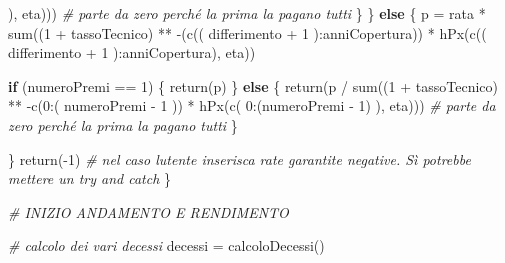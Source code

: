 \documentclass[
]{article}
\newenvironment{Shaded}{\begin{snugshade}}{\end{snugshade}}
\newcommand{\CommentTok}[1]{\textcolor[rgb]{0.56,0.35,0.01}{\textit{#1}}}
\newcommand{\ControlFlowTok}[1]{\textcolor[rgb]{0.13,0.29,0.53}{\textbf{#1}}}
\newcommand{\DecValTok}[1]{\textcolor[rgb]{0.00,0.00,0.81}{#1}}
\newcommand{\FunctionTok}[1]{\textcolor[rgb]{0.00,0.00,0.00}{#1}}
\newcommand{\NormalTok}[1]{#1}
\newcommand{\OtherTok}[1]{\textcolor[rgb]{0.56,0.35,0.01}{#1}}
\newcommand{\SpecialCharTok}[1]{\textcolor[rgb]{0.00,0.00,0.00}{#1}}
\begin{document}
\begin{Shaded}
\begin{Highlighting}[]
\NormalTok{        ), eta))) }\CommentTok{\# parte da zero perché la prima la pagano tutti}
\NormalTok{      \}}
\NormalTok{    \} }\ControlFlowTok{else}
\NormalTok{    \{}
\NormalTok{      p }\OtherTok{=}\NormalTok{ rata }\SpecialCharTok{*} \FunctionTok{sum}\NormalTok{((}\DecValTok{1} \SpecialCharTok{+}\NormalTok{ tassoTecnico) }\SpecialCharTok{**} \SpecialCharTok{{-}}\NormalTok{(}\FunctionTok{c}\NormalTok{((}
\NormalTok{        differimento }\SpecialCharTok{+} \DecValTok{1}
\NormalTok{      )}\SpecialCharTok{:}\NormalTok{anniCopertura)) }\SpecialCharTok{*} \FunctionTok{hPx}\NormalTok{(}\FunctionTok{c}\NormalTok{((}
\NormalTok{        differimento }\SpecialCharTok{+} \DecValTok{1}
\NormalTok{      )}\SpecialCharTok{:}\NormalTok{anniCopertura), eta))}
      
      \ControlFlowTok{if}\NormalTok{ (numeroPremi }\SpecialCharTok{==} \DecValTok{1}\NormalTok{)}
\NormalTok{      \{}
        \FunctionTok{return}\NormalTok{(p)}
\NormalTok{      \} }\ControlFlowTok{else}
\NormalTok{      \{}
        \FunctionTok{return}\NormalTok{(p }\SpecialCharTok{/} \FunctionTok{sum}\NormalTok{((}\DecValTok{1} \SpecialCharTok{+}\NormalTok{ tassoTecnico) }\SpecialCharTok{**} \SpecialCharTok{{-}}\FunctionTok{c}\NormalTok{(}\DecValTok{0}\SpecialCharTok{:}\NormalTok{(}
\NormalTok{          numeroPremi }\SpecialCharTok{{-}} \DecValTok{1}
\NormalTok{        )) }\SpecialCharTok{*} \FunctionTok{hPx}\NormalTok{(}\FunctionTok{c}\NormalTok{(}
          \DecValTok{0}\SpecialCharTok{:}\NormalTok{(numeroPremi }\SpecialCharTok{{-}} \DecValTok{1}\NormalTok{)}
\NormalTok{        ), eta))) }\CommentTok{\# parte da zero perché la prima la pagano tutti}
\NormalTok{      \}}
      
\NormalTok{    \}}
    \FunctionTok{return}\NormalTok{(}\SpecialCharTok{{-}}\DecValTok{1}\NormalTok{) }\CommentTok{\# nel caso l\textquotesingle{}utente inserisca rate garantite negative. Sì potrebbe mettere un try and catch}
\NormalTok{  \}}
  
  \CommentTok{\# INIZIO ANDAMENTO E RENDIMENTO}
  
  \CommentTok{\# calcolo dei vari decessi}
\NormalTok{  decessi }\OtherTok{=} \FunctionTok{calcoloDecessi}\NormalTok{()}
  

\end{Highlighting}
\end{Shaded}
\end{document}
